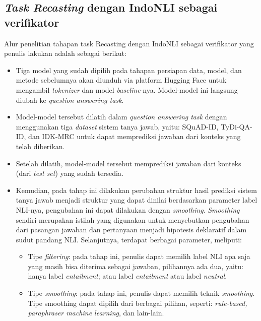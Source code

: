 \subsection{\emph{Task Recasting} dengan IndoNLI sebagai verifikator}
Alur penelitian tahapan task Recasting dengan IndoNLI sebagai verifikator yang penulis lakukan adalah sebagai berikut:

\begin{itemize}
    
    \item Tiga model yang sudah dipilih pada tahapan persiapan data, model, dan metode sebelumnya akan diunduh via platform Hugging Face untuk mengambil \emph{tokenizer} dan model \emph{baseline}-nya. Model-model ini langsung diubah ke \emph{question answering task}.
    
    \item Model-model tersebut dilatih dalam \emph{question answering task} dengan menggunakan tiga \emph{dataset} sistem tanya jawab, yaitu: SQuAD-ID, TyDi-QA-ID, dan IDK-MRC untuk dapat memprediksi jawaban dari konteks yang telah diberikan.
    
    \item Setelah dilatih, model-model tersebut memprediksi jawaban dari konteks (dari \emph{test set}) yang sudah tersedia.
    
    \item Kemudian, pada tahap ini dilakukan perubahan struktur hasil prediksi sistem tanya jawab menjadi struktur yang dapat dinilai berdasarkan parameter label NLI-nya, pengubahan ini dapat dilakukan dengan \emph{smoothing}. \emph{Smoothing} sendiri merupakan istilah yang digunakan untuk menyebutkan pengubahan dari pasangan jawaban dan pertanyaan menjadi hipotesis deklaratif dalam sudut pandang NLI. Selanjutnya, terdapat berbagai parameter, meliputi:
    
    \begin{itemize}
        
        \item Tipe \emph{filtering}: pada tahap ini, penulis dapat memilih label NLI apa saja yang masih bisa diterima sebagai jawaban, pilihannya ada dua, yaitu: hanya label \emph{entailment}; atau label \emph{entailment} atau label \emph{neutral}.
        
        \item Tipe \emph{smoothing}: pada tahap ini, penulis dapat memilih teknik \emph{smoothing}. Tipe smoothing dapat dipilih dari berbagai pilihan, seperti: \emph{rule-based, paraphraser machine learning}, dan lain-lain.
        

\end{itemize}
\end{itemize}
